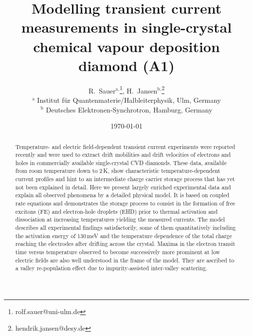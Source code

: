 \documentclass[a4paper,10pt]{scrartcl}
\makeatletter
\renewcommand{\maketitle}{\bgroup\setlength{\parindent}{0pt}
\begin{center}
  \vspace*{10mm}
  {\textbf{\huge\sffamily\@title}\par}
  \vspace{5mm}
   
  \large \@author 
  \vspace{5mm}
  \@date
\end{center}\egroup
}
\makeatother
\begin{document}
\title{Modelling transient current measurements in single-crystal chemical vapour deposition diamond {\color{red}(A1)}}
\author{
 R.~Sauer${}^{\textrm{a,}}$\footnote[*]{rolf.sauer@uni-ulm.de},
H.~Jansen${}^{\textrm{b,}}$\footnote[\dag]{hendrik.jansen@desy.de}\\
\vspace{5mm}
${}^{\textrm{a}}$ Institut f\"ur Quantenmaterie/Halbleiterphysik, Ulm, Germany\\
${}^{\textrm{b}}$ Deutsches Elektronen-Synchrotron, Hamburg, Germany\\
}
\date{\today}
\maketitle
\tableofcontents

\linenumbers
\begin{abstract}
\noindent

Temperature- and electric field-dependent transient current experiments were reported recently and were used to extract drift mobilities and drift velocities of electrons and holes in commercially
 available single-crystal CVD diamonds. 
These data, available from room temperature down to 2\,K, show characteristic temperature-dependent current profiles and
  hint to an intermediate charge carrier storage process that has yet not been explained in detail. 
Here we present largely enriched experimental data and explain all observed phenomena by a detailed physical model. 
It is based on coupled rate equations and demonstrates the storage process to consist in the formation of free excitons (FE) and electron-hole droplets (EHD)
 prior to thermal activation and dissociation at increasing temperatures yielding the measured currents. 
The model describes all experimental findings satisfactorily, some of them quantitatively including the activation energy of 130\,meV
 and the temperature dependence of the total charge reaching the electrodes after drifting across the crystal. 
Maxima in the electron transit time versus temperature observed to become successively more prominent at low electric fields are also well understood in the frame of the model. 
They are ascribed to a valley re-population effect due to impurity-assisted inter-valley scattering.


\end{abstract}
\end{document}
